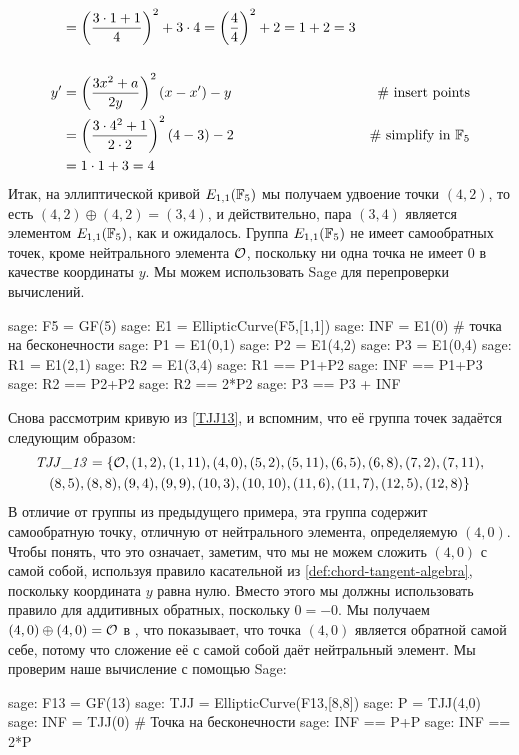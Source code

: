 \begin{example}
\begin{align*}
    & = \left(\frac{3\cdot 1+1}{4}\right)^2 +3\cdot 4
      = \left(\frac{4}{4}\right)^2 +2
      = 1 +2 
      = 3
\\
\\
y'  & = \left(\frac{3x^2+a}{2y}\right)^2\left(x-x'\right) - y  & \text{\# insert points} \\
    & = \left(\frac{3\cdot 4^2+1}{2\cdot 2}\right)^2\left(4-3\right) - 2 & \text{\# simplify in } \mathbb{F}_5\\
    & = 1\cdot 1 + 3
      = 4
\end{align*}
Итак, на эллиптической кривой $E_{1,1}(\mathbb{F}_5)$ мы получаем удвоение точки $(4,2)$, то есть $(4,2)\oplus (4,2) =(3,4)$, и действительно, пара $(3,4)$ является элементом $E_{1,1}(\mathbb{F}_5)$, как и ожидалось. Группа $E_{1,1}(\mathbb{F}_5)$ не имеет самообратных точек, кроме нейтрального элемента $\mathcal{O}$, поскольку ни одна точка не имеет $0$ в качестве координаты $y$. Мы можем использовать Sage для перепроверки вычислений. 
\begin{sagecommandline}
sage: F5 = GF(5)
sage: E1 = EllipticCurve(F5,[1,1])
sage: INF = E1(0) # точка на бесконечности
sage: P1 = E1(0,1)
sage: P2 = E1(4,2)
sage: P3 = E1(0,4)
sage: R1 = E1(2,1)
sage: R2 = E1(3,4)
sage: R1 == P1+P2
sage: INF == P1+P3
sage: R2 == P2+P2
sage: R2 == 2*P2
sage: P3 == P3 + INF
\end{sagecommandline}
\end{example}
\begin{example}\label{ex:TJJ13-self-inverse} Снова рассмотрим кривую \TJJ{} из \examplename{} \ref{TJJ13}, и вспомним, что её группа точек задаётся следующим образом:
\begin{multline}
\mathit{TJJ\_13} = \{\mathcal{O}, (1, 2), (1, 11), (4, 0), (5, 2), (5, 11), (6, 5), (6, 8), (7,2), (7, 11), \\ (8, 5), (8, 8), (9, 4), (9, 9), (10, 3), (10,
10), (11, 6), (11, 7), (12, 5), (12, 8)\}
\end{multline}
В отличие от группы из предыдущего примера, эта группа содержит самообратную точку, отличную от нейтрального элемента, определяемую $(4,0)$. Чтобы понять, что это означает, заметим, что мы не можем сложить $(4,0)$ с самой собой, используя правило касательной из  \ref{def:chord-tangent-algebra}, поскольку координата $y$ равна нулю. Вместо этого мы должны использовать правило для аддитивных обратных, поскольку $0=-0$. Мы получаем $(4,0)\oplus (4,0)=\mathcal{O}$ в \TJJ{}, что показывает, что точка $(4,0)$ является обратной самой себе, потому что сложение её с самой собой даёт нейтральный элемент. Мы проверим наше вычисление с помощью Sage:

\begin{sagecommandline}
sage: F13 = GF(13)
sage: TJJ = EllipticCurve(F13,[8,8])
sage: P = TJJ(4,0)
sage: INF = TJJ(0) # Точка на бесконечности
sage: INF == P+P
sage: INF == 2*P
\end{sagecommandline}
\end{example}
